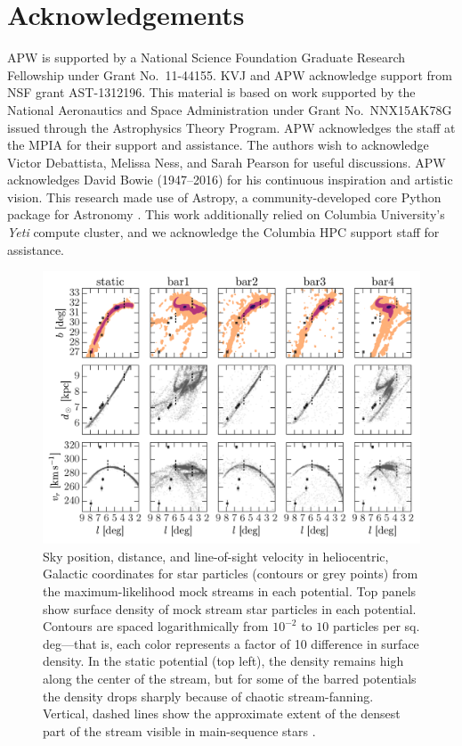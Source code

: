\section*{Acknowledgements}
APW is supported by a National Science Foundation Graduate Research Fellowship
under Grant No.\ 11-44155. KVJ and APW acknowledge support from NSF grant
AST-1312196. This material is based on work supported by the National
Aeronautics and Space Administration under Grant No.\, NNX15AK78G issued through
the Astrophysics Theory Program. APW acknowledges the staff at the MPIA for
their support and assistance. The authors wish to acknowledge Victor Debattista,
Melissa Ness, and Sarah Pearson for useful discussions. APW acknowledges David
Bowie (1947--2016) for his continuous inspiration and artistic vision. This
research made use of Astropy, a community-developed core Python package for
Astronomy \citep{astropy13}. This work additionally relied on Columbia
University's \emph{Yeti} compute cluster, and we acknowledge the Columbia HPC
support staff for assistance. \\



\begin{figure}[p]
\begin{center}
\includegraphics[width=\textwidth]{figures/ch4/mockstream0}
\caption{ Sky position, distance, and line-of-sight velocity in heliocentric,
Galactic coordinates for star particles (contours or grey points) from the
maximum-likelihood mock streams in each potential. Top panels show surface
density of mock stream star particles in each potential. Contours are spaced
logarithmically from $10^{-2}$ to $10$ particles per sq. deg---that is, each
color represents a factor of 10 difference in surface density. In the static
potential (top left), the density remains high along the center of the stream,
but for some of the barred potentials the density drops sharply because of
chaotic stream-fanning. Vertical, dashed lines show the approximate extent of
the densest part of the stream visible in main-sequence stars \citep[the segment
originally detected in ][]{bernard14}.}
\label{fig:mockstream0}
\end{center}
\end{figure}


